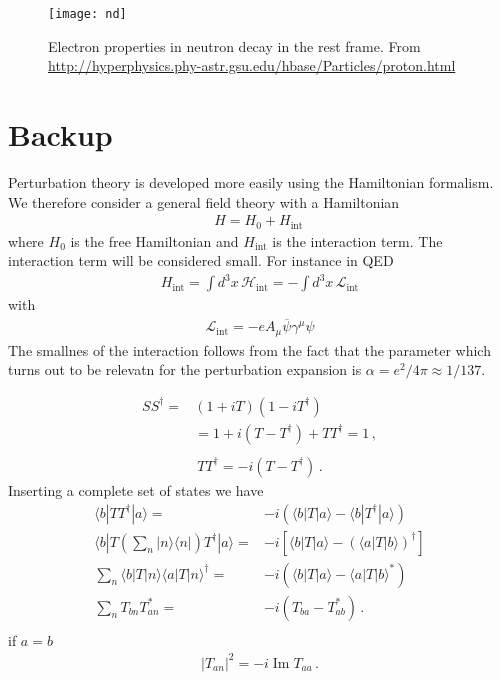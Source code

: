 \begin{figure}
  \centering
  \texttt{[image: nd]}
  \caption{Electron properties in neutron decay in the rest frame. From \url{http://hyperphysics.phy-astr.gsu.edu/hbase/Particles/proton.html}}
  \label{fig:nd}
\end{figure}


\section{Backup}
\label{sec:backup}

Perturbation theory is developed more easily using the Hamiltonian formalism. We therefore consider a general field theory with a Hamiltonian
\begin{align}
  \label{eq:75}
  H=H_0+H_{\text{int}}\,
\end{align}
where $H_0$ is the free Hamiltonian and $H_{\text{int}}$ is the interaction term. The interaction term will be considered small. For instance in QED
\begin{align}
  H_{\text{int}}=\int d^3x\,\mathcal{H}_{\text{int}}=-\int d^3x\,\mathcal{L}_{\text{int}}
\end{align}
with
\begin{align}
  \mathcal{L}_{\text{int}}=-e A_\mu\overline{\psi}\gamma^\mu\psi
\end{align}
The smallnes of the interaction follows from the fact that the parameter which turns out to be relevatn for the perturbation expansion is $\alpha=e^2/4\pi\approx1/137$.


\begin{align}
  S S^\dagger=&(1+i T)(1-i T^\dagger)\nonumber\\
  &=1+i(T-T^\dagger)+T T^\dagger=1\,,\nonumber\\
\end{align}
\begin{align}
  T T^\dagger=-i(T-T^\dagger)\,.
\end{align}
Inserting a complete set of states we have
\begin{align}
  \langle b|T T^\dagger|a\rangle=&-i(\langle b|T|a\rangle-\langle b|T^\dagger|a\rangle)\nonumber\\
\langle b|T\left(\sum_n|n\rangle\langle n|\right)T^\dagger|a\rangle=&-i\left[\langle b|T|a\rangle-\left(\langle a|T|b\rangle\right)^\dagger\right]\nonumber\\
\sum_n\langle b|T|n\rangle\langle a|T|n\rangle^\dagger=&-i\left(\langle b|T|a\rangle-\langle a|T|b\rangle^*\right)\nonumber\\
\sum_n T_{bn}T_{an}^*=&-i\left(T_{ba}-T_{ab}^*\right)\,.\nonumber\\
\end{align}
if $a=b$
\begin{align}
  |T_{an}|^2=-i\operatorname{Im}T_{aa} \,.
\end{align}

